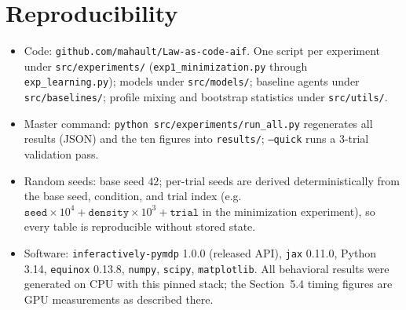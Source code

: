 \documentclass[10pt,twocolumn]{article}
\begin{document}
\begin{table}[H]
\centering
\scriptsize
{}
\caption{Dirichlet concentrations per observation modality. $\alpha = 1$ denotes a flat prior over each conditional distribution; $10^4 \times$ true pins the modality to its calibrated value while remaining formally learnable.}
\label{tab:app-priors}
\end{table}

\section{Reproducibility}
\label{app:repro}

\begin{itemize}
  \item Code: \texttt{github.com/mahault/Law-as-code-aif}. One script per experiment under \texttt{src/experiments/} (\texttt{exp1\_minimization.py} through \texttt{exp\_learning.py}); models under \texttt{src/models/}; baseline agents under \texttt{src/baselines/}; profile mixing and bootstrap statistics under \texttt{src/utils/}.
  \item Master command: \texttt{python src/experiments/run\_all.py} regenerates all results (JSON) and the ten figures into \texttt{results/}; \texttt{--quick} runs a 3-trial validation pass.
  \item Random seeds: base seed $42$; per-trial seeds are derived deterministically from the base seed, condition, and trial index (e.g.\ $\texttt{seed} \times 10^4 + \texttt{density} \times 10^3 + \texttt{trial}$ in the minimization experiment), so every table is reproducible without stored state.
  \item Software: \texttt{inferactively-pymdp} 1.0.0 (released API), \texttt{jax} 0.11.0, Python 3.14, \texttt{equinox} 0.13.8, \texttt{numpy}, \texttt{scipy}, \texttt{matplotlib}. All behavioral results were generated on CPU with this pinned stack; the Section~5.4 timing figures are GPU measurements as described there.
\end{itemize}
\end{document}
